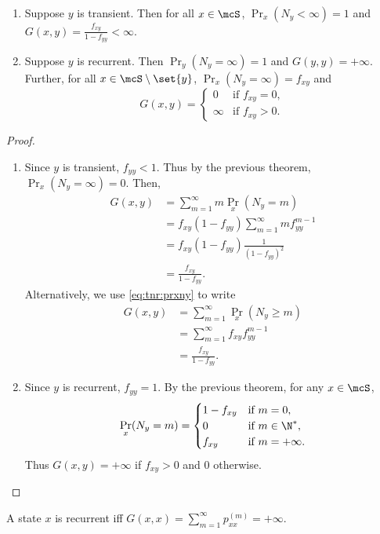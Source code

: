 \begin{theorem*} \leavevmode
    \begin{enumerate}[label=(\arabic*)]
        \item Suppose $y$ is transient.
        Then for all $x \in \mcS$, $\Pr_x(N_y < \infty) = 1$ and
        $G(x, y) = \frac{f_{xy}}{1 - f_{yy}} < \infty$.
        \item Suppose $y$ is recurrent.
        Then $\Pr_y(N_y = \infty) = 1$ and $G(y, y) = +\infty$.
        Further, for all $x \in \mcS \setminus \set{y}$,
        $\Pr_x(N_y = \infty) = f_{xy}$ and \[
            G(x, y) = \begin{cases}
                0 & \text{if } f_{xy} = 0, \\
                \infty & \text{if } f_{xy} > 0.
            \end{cases}
        \]
    \end{enumerate}
\end{theorem*}
\begin{proof} \leavevmode
    \begin{enumerate}[label=(\arabic*)]
        \item Since $y$ is transient, $f_{yy} < 1$.
        Thus by the previous theorem, $\Pr_x(N_y = \infty) = 0$.
        Then, \begin{align*}
            G(x, y) &= \sum_{m=1}^{\infty} m \Pr_x(N_y = m) \\
                    &= f_{xy} (1 - f_{yy})
                        \sum_{m=1}^{\infty} m f_{yy}^{m-1} \\
                    &= f_{xy} (1 - f_{yy}) \frac{1}{(1 - f_{yy})^2} \\
                    &= \frac{f_{xy}}{1 - f_{yy}}.
        \end{align*}
        Alternatively, we use \cref{eq:tnr:prxny} to write \begin{align*}
            G(x, y) &= \sum_{m=1}^{\infty} \Pr_x(N_y \ge m) \\
                    &= \sum_{m=1}^{\infty} f_{xy} f_{yy}^{m-1} \\
                    &= \frac{f_{xy}}{1 - f_{yy}}.
        \end{align*}
        \item Since $y$ is recurrent, $f_{yy} = 1$.
        By the previous theorem, for any $x \in \mcS$, \[
            \Pr_x(N_y = m) = \begin{cases}
                1 - f_{xy} & \text{if } m = 0, \\
                0 & \text{if } m \in \N^*, \\
                f_{xy} & \text{if } m = +\infty.
            \end{cases}
        \] Thus $G(x, y) = +\infty$ if $f_{xy} > 0$ and $0$ otherwise.
        \qedhere
    \end{enumerate}
\end{proof}
\begin{corollary*}
    A state $x$ is recurrent iff
    $G(x, x) = \sum_{m=1}^{\infty} p_{xx}^{(m)} = +\infty$.
\end{corollary*}

